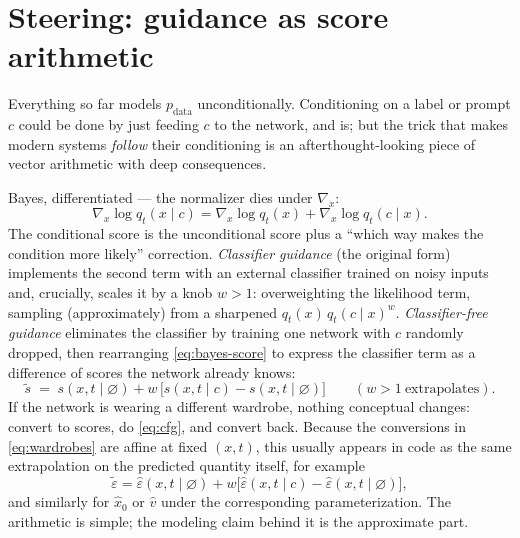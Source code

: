 \documentclass[10pt,a4paper]{article}
\newcommand{\score}{s}
\newcommand{\veps}{\varepsilon}
\begin{document}
\section{Steering: guidance as score arithmetic}
\label{sec:guidance}

Everything so far models $p_{\mathrm{data}}$ unconditionally. Conditioning
on a label or prompt $c$ could be done by just feeding $c$ to the network,
and is; but the trick that makes modern systems \emph{follow} their
conditioning is an afterthought-looking piece of vector arithmetic with
deep consequences.

Bayes, differentiated --- the normalizer dies under $\nabla_x$:
\begin{equation}
\nabla_x \log q_t(x \mid c)
= \nabla_x \log q_t(x) + \nabla_x \log q_t(c \mid x).
\label{eq:bayes-score}
\end{equation}
The conditional score is the unconditional score plus a ``which way makes
the condition more likely'' correction. \emph{Classifier guidance} (the
original form) implements the second term with an external classifier
trained on noisy inputs and, crucially, scales it by a knob $w > 1$:
overweighting the likelihood term, sampling (approximately) from a
sharpened $q_t(x)\,q_t(c \mid x)^w$. \emph{Classifier-free guidance}
eliminates the classifier by training one network with $c$ randomly
dropped, then rearranging \eqref{eq:bayes-score} to express the classifier
term as a difference of scores the network already knows:
\begin{equation}
\tilde\score \;=\; \score(x, t \mid \varnothing)
+ w\,\big[ \score(x, t \mid c) - \score(x, t \mid \varnothing) \big]
\qquad (w > 1\ \text{extrapolates}).
\label{eq:cfg}
\end{equation}
If the network is wearing a different wardrobe, nothing conceptual
changes: convert to scores, do \eqref{eq:cfg}, and convert back. Because
the conversions in \eqref{eq:wardrobes} are affine at fixed $(x,t)$, this
usually appears in code as the same extrapolation on the predicted
quantity itself, for example
\begin{equation}
\tilde\veps
= \hat\veps(x,t \mid \varnothing)
+ w\big[\hat\veps(x,t \mid c)-\hat\veps(x,t \mid \varnothing)\big],
\end{equation}
and similarly for $\hat{x}_0$ or $\hat v$ under the corresponding
parameterization. The arithmetic is simple; the modeling claim behind it
is the approximate part.
\end{document}
